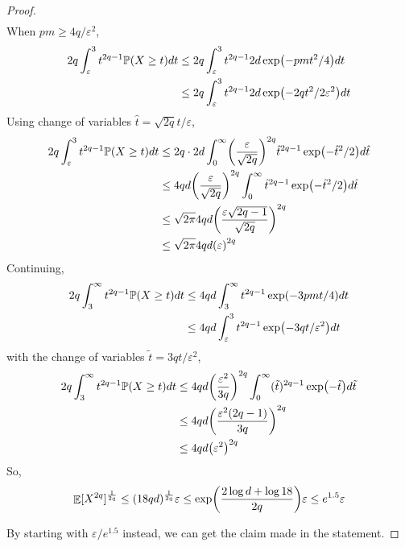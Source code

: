 \documentclass[11pt]{amsart}
\numberwithin{equation}{section}
\numberwithin{equation}{section}
\DeclareMathOperator{\E}{\mathbb{E}}
\def \P {\mathbb{P}}
\DeclarePairedDelimiter{\paren}{(}{)}
\theoremstyle{remark}
\theoremstyle{definition}
\begin{document}
\begin{proof}
\begin{align*}
    \end{align*}
    When $pm \ge 4q/\varepsilon^2$, 
    \begin{align*}
        2q \int_\varepsilon^3 t^{2q-1} \P(X \ge t) dt &\le 2q \int_\varepsilon^3 t^{2q-1} 2d \exp \paren*{-pmt^2/4} dt \\
        &\le 2q \int_\varepsilon^3 t^{2q-1} 2d \exp \paren*{-2q t^2/2\varepsilon^2} dt \\
    \end{align*}
    Using change of variables $\hat{t} = \sqrt{2q}t/\varepsilon$,
    \begin{align*}
        2q \int_{\varepsilon}^3 t^{2q-1} \P(X \ge t) dt 
        &\le 2q \cdot 2d \int_0^\infty \paren*{\frac{\varepsilon}{\sqrt{2q}}}^{2q} \hat{t}^{2q-1}  \exp \paren*{-\hat{t}^2/2} d\hat{t} \\
        &\le 4qd \paren*{\frac{\varepsilon}{\sqrt{2q}}}^{2q} \int_0^\infty  \hat{t}^{2q-1}  \exp \paren*{-\hat{t}^2/2} d\hat{t} \\
        &\le \sqrt{2\pi} 4qd \paren*{\frac{\varepsilon \sqrt{2q-1} }{\sqrt{2q}}}^{2q}   \\
        &\le \sqrt{2\pi} 4qd \paren*{\varepsilon}^{2q}   \\
    \end{align*}
    Continuing,
    \begin{align*}
        2q \int_3^\infty t^{2q-1} \P(X \ge t) dt &\le 4qd \int_3^\infty t^{2q-1} \exp \paren*{-3pmt/4} dt \\
        &\le 4qd \int_\varepsilon^3 t^{2q-1} \exp \paren*{-3q t/\varepsilon^2} dt \\
    \end{align*}
    with the change of variables $\tilde{t} = 3qt/\varepsilon^2$,
    \begin{align*}
        2q \int_3^\infty t^{2q-1} \P(X \ge t) dt  &\le 4qd \paren*{\frac{\varepsilon^2}{3q}}^{2q} \int_0^\infty (\tilde{t})^{2q-1} \exp \paren*{-\tilde{t}} d\tilde{t} \\
        &\le 4qd \paren*{\frac{\varepsilon^2(2q-1)}{3q}}^{2q} \\
        &\le 4qd \paren*{\varepsilon^2}^{2q}
    \end{align*}
    So, $$\E[X^{2q}]^\frac{1}{2q} \le (18qd)^\frac{1}{2q} \varepsilon \le \exp \paren*{\frac{2\log d + \log 18}{2q}}  \varepsilon \le e^{1.5} \varepsilon$$

    By starting with $\varepsilon/e^{1.5}$ instead, we can get the claim made in the statement.
\end{proof}
\end{document}
